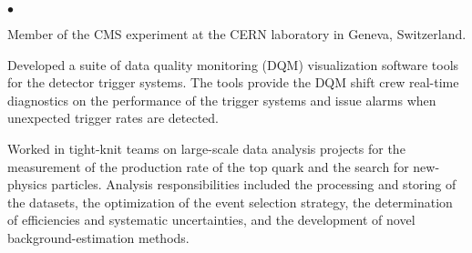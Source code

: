 \documentclass[margin,line]{res}
\newenvironment{list2}{
  \begin{list}{$\bullet$}{%
      \setlength{\itemsep}{0in}
      \setlength{\parsep}{0in} \setlength{\parskip}{0in}
      \setlength{\topsep}{0in} \setlength{\partopsep}{0in} 
      \setlength{\leftmargin}{0.2in}}}{\end{list}}
\begin{document}
\begin{resume}
\begin{list2}


\item Member of the CMS experiment at the CERN laboratory in Geneva,
Switzerland.  
\item Developed a suite of data quality monitoring (DQM) visualization
  software tools for the detector trigger systems. The tools provide
  the DQM shift crew real-time diagnostics on the performance of the
  trigger systems and issue alarms when unexpected trigger rates are
  detected.
\item Worked in tight-knit teams on large-scale data analysis projects
  for the measurement of the production rate of the top quark and the
  search for new-physics particles.  Analysis responsibilities
  included the processing and storing of the datasets, the
  optimization of the event selection strategy, the determination of
  efficiencies and systematic uncertainties, and the development of
  novel background-estimation methods.

\end{list2}




\end{resume}
\end{document}
